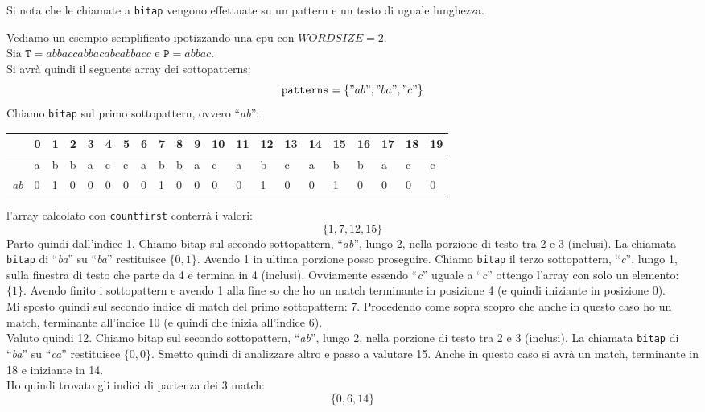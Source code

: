 \documentclass[a4paper,12pt, oneside]{article}
\begin{document}
Si nota che le chiamate a \texttt{bitap} vengono effettuate su un
pattern e un testo di uguale lunghezza.
\begin{esempio}
  Vediamo un esempio semplificato ipotizzando una cpu con
  $WORDSIZE=2$.\\
  Sia $\mathtt{T}=abbaccabbacabcabbacc$ e $\mathtt{P}=abbac$.\\
  Si avrà quindi il seguente array dei sottopatterns:
  \[\mathtt{patterns}=\{"ab", "ba", "c"\}\]
  Chiamo \texttt{bitap} sul primo sottopattern, ovvero
  ``\textit{ab}'':
  \begin{center}
    \begin{tabular}{l|l|l|l|l|l|l|l|l|l|l|l|l|l|l|l|l|l|l|l|l|}
      \hline
      & 0 & 1 & 2 & 3 & 4 & 5 & 6 & 7 & 8 & 9 & 10 & 11 & 12 & 13 &
                                                                    14
      & 15 & 16 & 17 & 18 & 19 \\ \hline
      & a & b & b & a & c & c & a & b & b & a & c & a & b & c & a & b &
                                                                        b
                & a & c & c \\ \hline  
      \textit{ab} & 0 & 1 & 0 & 0 & 0 & 0 & 0 & 1 & 0 & 0 & 0 & 0 & 1 & 0 & 0 & 1 &
                                                                                    0
                & 0 & 0 & 0 \\ \hline
    \end{tabular}
  \end{center}
  l'array calcolato con \texttt{countfirst} conterrà i valori:
  \[\{1,7,12,15\}\]
  Parto quindi dall'indice 1. Chiamo bitap sul secondo sottopattern,
  ``\textit{ab}'', lungo 2, nella porzione di testo tra 2 e
  3 (inclusi). La chiamata \texttt{bitap} di ``\textit{ba}'' su ``\textit{ba}''
  restituisce $\{0,1\}$. Avendo 1 in ultima porzione posso proseguire.
  Chiamo \texttt{bitap} il terzo sottopattern, ``\textit{c}'', lungo
  1, sulla finestra di testo che parte da 4 e termina in 4 (inclusi). Ovviamente
  essendo ``\textit{c}'' uguale a ``\textit{c}'' ottengo l'array con
  solo un elemento: $\{1\}$. Avendo finito i sottopattern e avendo 1
  alla fine so che ho un match terminante in posizione 4 (e quindi
  iniziante in posizione 0). \\Mi sposto quindi sul secondo indice di
  match del primo sottopattern: 7. Procedendo come sopra scopro che
  anche in questo caso ho un match, terminante all'indice 10 (e quindi
  che inizia all'indice 6). \\Valuto quindi 12.  Chiamo bitap sul
  secondo sottopattern, ``\textit{ab}'', lungo 2, nella porzione di
  testo tra 2 e 3 (inclusi). La chiamata \texttt{bitap} di
  ``\textit{ba}'' su ``\textit{ca}''  restituisce $\{0,0\}$. Smetto
  quindi di analizzare altro e passo a valutare 15. Anche in questo
  caso si avrà un match, terminante in 18 e iniziante in 14.\\
  Ho quindi trovato gli indici di partenza dei 3 match:
  \[\{0,6,14\}\]
\end{esempio}
\end{document}
